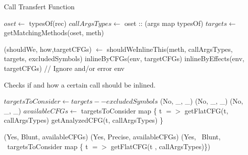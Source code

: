 \documentclass[a4paper]{article}
\begin{document}
\FloatBarrier


\begin{algorithm}
\caption{Call Transfert Function}\label{algo:pt:methcall}
\begin{algorithmic}[1]
    \State $oset \gets$ typesOf(rec)
    \State $callArgsTypes \gets$ oset :: (args map typesOf)
    \State $targets \gets$ getMatchingMethods(oset, meth)

    \State (shouldWe, how,targetCFGs) $\gets$ shouldWeInlineThis(meth, callArgsTypes, targets, excludedSymbols)
            \State \Return inlineByCFGs(env, targetCFGs)
        \Else
            \State \Return inlineByEffects(env, targetCFGs)
        \EndIf
    \Else
        \State // Ignore and/or error
        \State \Return env
    \EndIf
\EndFunction
\end{algorithmic}
\end{algorithm}

\begin{algorithm}
\caption{Checks if and how a certain call should be inlined.}\label{algo:pt:shouldwe}
\begin{algorithmic}[1]
    \State $targetsToConsider \gets targets -- excludedSymbols$
            \State \Return (No, \_, \_)
            \State \Return (No, \_, \_)
            \State \Return (No, \_, \_)
        \Else
            \State $availableCFGs \gets$ targetsToConsider map \{ t $=>$
                \State getFlatCFG(t, callArgsTypes)
            \Else
                \State getAnalyzedCFG(t, callArgsTypes)
            \EndIf
            \State \}

                \State \Return (Yes, Blunt, availableCFGs)
            \Else
                \State \Return (Yes, Precise, availableCFGs)
            \EndIf
        \EndIf
    \Else
        \State \Return (Yes, ~Blunt, ~targetsToConsider map \{ t $=>$ getFlatCFG(t , callArgsTypes)\})
    \EndIf
\EndFunction
\end{algorithmic}
\end{algorithm}
\end{document}
